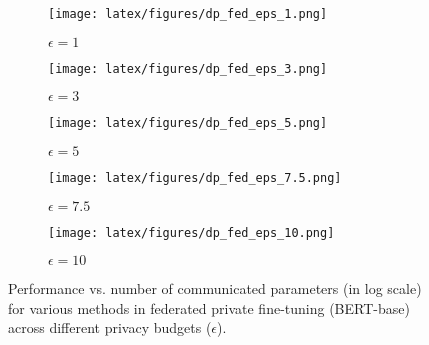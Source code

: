 \begin{figure*}[ht]
    \centering
    \begin{subfigure}{0.49\textwidth}
        \centering
        \texttt{[image: latex/figures/dp\_fed\_eps\_1.png]}
        \caption{$\epsilon = 1$}
        \label{fig:dp-fed-eps-1}
    \end{subfigure}
    \begin{subfigure}{0.49\textwidth}
        \centering
        \texttt{[image: latex/figures/dp\_fed\_eps\_3.png]}
        \caption{$\epsilon = 3$}
        \label{fig:dp-fed-eps-3}
    \end{subfigure}
    \begin{subfigure}{0.49\textwidth}
        \centering
        \texttt{[image: latex/figures/dp\_fed\_eps\_5.png]}
        \caption{$\epsilon = 5$}
        \label{fig:dp-fed-eps-5}
    \end{subfigure}
    \begin{subfigure}{0.49\textwidth}
        \centering
        \texttt{[image: latex/figures/dp\_fed\_eps\_7.5.png]}
        \caption{$\epsilon = 7.5$}
        \label{fig:dp-fed-eps-7.5}
    \end{subfigure}
    \begin{subfigure}{0.49\textwidth}
        \centering
        \texttt{[image: latex/figures/dp\_fed\_eps\_10.png]}
        \caption{$\epsilon = 10$}
        \label{fig:dp-fed-eps-10}
    \end{subfigure}
    \caption{Performance vs. number of communicated parameters (in log scale) for various methods in federated private fine-tuning (BERT-base) across different privacy budgets ($\epsilon$).}
    \label{fig:plots-dp-fed-eps}
\end{figure*}